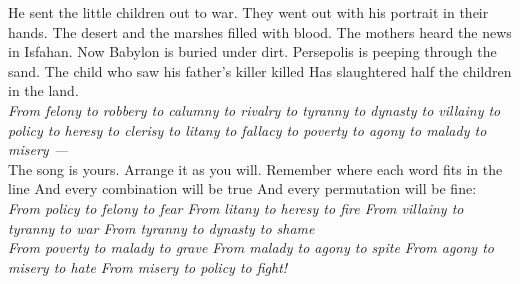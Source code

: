 \begin{poem}
 He sent the little children out to war.
 They went out with his portrait in their hands.
 The desert and the marshes filled with blood.
 The mothers heard the news in Isfahan.
 Now Babylon is buried under dirt.
 Persepolis is peeping through the sand.
 The child who saw his father's killer killed
 Has slaughtered half the children in the land.\\

\textit{
 From felony
 to robbery
 to calumny
 to rivalry
 to tyranny
 to dynasty
 to villainy
 to policy
 to heresy
 to clerisy
 to litany
 to fallacy
 to poverty
 to agony
 to malady
 to misery ---}\\

 The song is yours. Arrange it as you will.
 Remember where each word fits in the line
 And every combination will be true
 And every permutation will be fine:\\

\textit{
  From policy to felony to fear
  From litany to heresy to fire
  From villainy to tyranny to war
  From tyranny to dynasty to shame}\\

\textit{
  From poverty to malady to grave
  From malady to agony to spite
  From agony to misery to hate
  From misery to policy to fight!}\\
 \end{poem}

